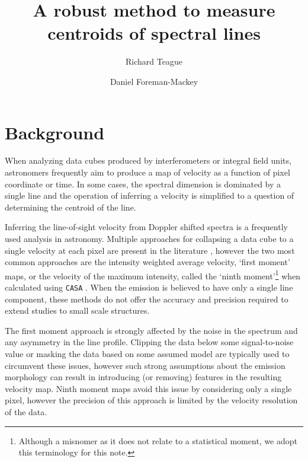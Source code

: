 \documentclass[rnaas]{aastex62}
\begin{document}
\raggedbottom\sloppy\sloppypar\frenchspacing

\title{%
A robust method to measure centroids of spectral lines
}

\author[0000-0003-1534-5186]{Richard Teague}

\author[0000-0002-9328-5652]{Daniel Foreman-Mackey}


\section{Background}

When analyzing data cubes produced by interferometers or integral field units,
astronomers frequently aim to produce a map of velocity as a function of pixel
coordinate or time.
In some cases, the spectral dimension is dominated by a single line and the
operation of inferring a velocity is simplified to a question of determining
the centroid of the line.

Inferring the line-of-sight velocity from Doppler shifted spectra is a frequently used analysis in astronomy. Multiple approaches for collapsing a data cube to a single velocity at each pixel are present in the literature \citep[see, for example][]{deBlok:2008}, however the two most common approaches are the intensity weighted average velocity, `first moment' maps, or the velocity of the maximum intensity, called the `ninth moment'\footnote{Although a misnomer as it does not relate to a statistical moment, we adopt this terminology for this note.} when calculated using \texttt{CASA} \citep{McMullin:2007}. When the emission is believed to have only a single line component, these methods do not offer the accuracy and precision required to extend studies to small scale structures.

The first moment approach is strongly affected by the noise in the spectrum and any asymmetry in the line profile. Clipping the data below some signal-to-noise value or masking the data based on some assumed model are typically used to circumvent these issues, however such strong assumptions about the emission morphology can result in introducing (or removing) features in the resulting velocity map. Ninth moment maps avoid this issue by considering only a single pixel, however the precision of this approach is limited by the velocity resolution of the data.
\end{document}
